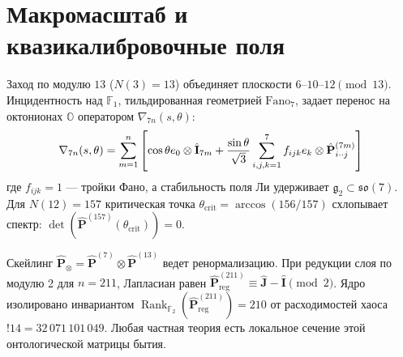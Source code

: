 \documentclass[10pt,twocolumn,fleqn]{article}
\DeclareMathOperator{\Rank}{Rank}
\begin{document}
\section{Макромасштаб и квазикалибровочные поля}
Заход по модулю $13$ ($N(3)=13$) объединяет плоскости $6\text{--}10\text{--}12 \pmod{13}$. Инцидентность над $\mathbb{F}_1$, тильдированная геометрией $\text{Fano}_7$, задает перенос на октонионах $\mathbb{O}$ оператором $\nabla_{7n}(s, \theta)$:
\begin{equation}\small
    \nabla_{7n}(s, \theta) = \sum_{m=1}^{n} \left[ \cos\theta e_0 \otimes \hat{\mathbf{I}}_{7m} + \frac{\sin\theta}{\sqrt{3}} \sum_{i,j,k=1}^{7} f_{ijk} e_k \otimes \hat{\mathbf{P}}^{(7m)}_{i\cdot\cdot j} \right]
\end{equation}
где $f_{ijk} = 1$ --- тройки Фано, а стабильность поля Ли удерживает $\mathfrak{g}_2 \subset \mathfrak{so}(7)$. Для $N(12)=157$ критическая точка $\theta_{\text{crit}} = \arccos(156/157)$ схлопывает спектр: $\det(\hat{\mathbf{P}}^{(157)}(\theta_{\text{crit}})) = 0$. 

Скейлинг $\hat{\mathbf{P}}_{\otimes} = \hat{\mathbf{P}}^{(7)} \otimes \hat{\mathbf{P}}^{(13)}$ ведет ренормализацию. При редукции слоя по модулю 2 для $n=211$, Лапласиан равен $\hat{\mathbf{P}}_{\text{reg}}^{(211)} \equiv \hat{\mathbf{J}} - \hat{\mathbf{I}} \pmod 2$. Ядро изолировано инвариантом $\Rank_{\mathbb{F}_2}(\hat{\mathbf{P}}_{\text{reg}}^{(211)}) = 210$ от расходимостей хаоса $!14 = 32\,071\,101\,049$. Любая частная теория есть локальное сечение этой онтологической матрицы бытия.
\end{document}
